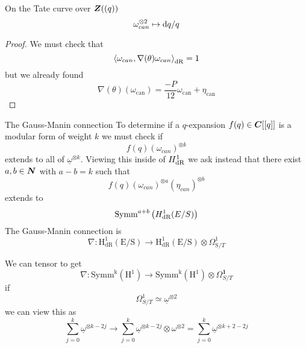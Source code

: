 \begin{frame}
    \begin{lemma}
        On the Tate curve over $\bm{Z}((q))$
        \[
            \omega_{can}^{\otimes 2} \mapsto \mathop{}\!\mathrm{d} q / q
        \]
    \end{lemma}
    \begin{proof}
        We must check that
        \[\left\langle \omega_{can}, \nabla(\theta) \omega_{can} \right\rangle_{\mathrm{dR}} = 1\]
        but we already found
        \[
            \nabla(\theta)\left(\omega_{\mathrm{can}}\right)=\frac{-P}{12} \omega_{\mathrm{can}}+\eta_{\mathrm{can}}
        \]
    \end{proof}
\end{frame}
\begin{frame}{The Gauss-Manin connection}
    To determine if a $q$-expansion $f(q) \in \bm C[[ q]]$ is a modular form of weight $k$ we must check if
    \[f(q) (\omega_{can})^{\otimes k}\]
    extends to all of $\underline \omega^{\otimes k}$.
    Viewing this inside of $H^1_{\mathrm{dR}}$ we ask instead that there exist $a,b\in \bm{N}$ with $a-b = k$ such that
    \[f(q) (\omega_{can})^{\otimes a}(\eta_{can})^{\otimes b}\]
    extends to 
    \[\text{Symm}^{{a+b}}\left({H}_{{\mathrm{dR}}}^{1}({E} / {S})\right) \]\pause
    The Gauss-Manin connection is
    \[
        \nabla: \mathrm{H}_{\mathrm{dR}}^{1}(\mathrm{E} / \mathrm{S}) \longrightarrow \mathrm{H}_{\mathrm{dR}}^{1}(\mathrm{E} / \mathrm{S}) \otimes \Omega_{\mathrm{S}/T}^{1} 
    \]
\end{frame}

\begin{frame}
    We can tensor to get
    \[
        \nabla \colon \text {Symm}^{\mathrm{k}}\left(\mathrm{H}^{1}\right) \longrightarrow \text{Symm}^{\mathrm{k}}\left(\mathrm{H}^{1}\right) \otimes \Omega_{S/T}^{\mathbf{1}}
    \]
    if
    \[
        \Omega_{S / T}^{1} \simeq \underline{\omega}^{\otimes 2}
    \]
    we can view this as
    \[
    \sum_{{j}=0}^{k} \underline{\omega}^{\otimes {k}-2 {j}} \longrightarrow \sum_{{j}=0}^{{k}} \underline{\omega}^{\otimes {k}-2 {j}} \otimes \omega^{\otimes 2}=\sum_{j=0}^{{k}} \underline{\omega}^{\otimes {k}+2-2 {j}}
    \]
\end{frame}

